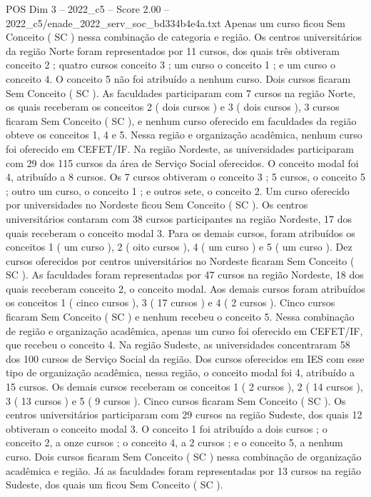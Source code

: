 \begin{textsample}{POS Dim 3 – 2022\_c5 – Score 2.00 – 2022\_c5/enade\_2022\_serv\_soc\_bd334b4e4a.txt}
Apenas um curso ficou Sem Conceito ( SC ) nessa combinação de categoria e região.
Os centros universitários da região Norte foram representados por 11 cursos, dos quais três obtiveram conceito 2 ; quatro cursos conceito 3 ; um curso o conceito 1 ; e um curso o conceito 4.
O conceito 5 não foi atribuído a nenhum curso.
Dois cursos ficaram Sem Conceito ( SC ).
As faculdades participaram com 7 cursos na região Norte, os quais receberam os conceitos 2 ( dois cursos ) e 3 ( dois cursos ), 3 cursos ficaram Sem Conceito ( SC ), e nenhum curso oferecido em faculdades da região obteve os conceitos 1, 4 e 5.
Nessa região e organização acadêmica, nenhum curso foi oferecido em CEFET/IF.
Na região Nordeste, as universidades participaram com 29 dos 115 cursos da área de Serviço Social oferecidos.
O conceito modal foi 4, atribuído a 8 cursos.
Os 7 cursos obtiveram o conceito 3 ; 5 cursos, o conceito 5 ; outro um curso, o conceito 1 ; e outros sete, o conceito 2.
Um curso oferecido por universidades no Nordeste ficou Sem Conceito ( SC ).
Os centros universitários contaram com 38 cursos participantes na região Nordeste, 17 dos quais receberam o conceito modal 3.
Para os demais cursos, foram atribuídos os conceitos 1 ( um curso ), 2 ( oito cursos ), 4 ( um curso ) e 5 ( um curso ).
Dez cursos oferecidos por centros universitários no Nordeste ficaram Sem Conceito ( SC ).
As faculdades foram representadas por 47 cursos na região Nordeste, 18 dos quais receberam conceito 2, o conceito modal.
Aos demais cursos foram atribuídos os conceitos 1 ( cinco cursos ), 3 ( 17 cursos ) e 4 ( 2 cursos ).
Cinco cursos ficaram Sem Conceito ( SC ) e nenhum recebeu o conceito 5.
Nessa combinação de região e organização acadêmica, apenas um curso foi oferecido em CEFET/IF, que recebeu o conceito 4.
Na região Sudeste, as universidades concentraram 58 dos 100 cursos de Serviço Social da região.
Dos cursos oferecidos em IES com esse tipo de organização acadêmica, nessa região, o conceito modal foi 4, atribuído a 15 cursos.
Os demais cursos receberam os conceitos 1 ( 2 cursos ), 2 ( 14 cursos ), 3 ( 13 cursos ) e 5 ( 9 cursos ).
Cinco cursos ficaram Sem Conceito ( SC ).
Os centros universitários participaram com 29 cursos na região Sudeste, dos quais 12 obtiveram o conceito modal 3.
O conceito 1 foi atribuído a dois cursos ; o conceito 2, a onze cursos ; o conceito 4, a 2 cursos ; e o conceito 5, a nenhum curso.
Dois cursos ficaram Sem Conceito ( SC ) nessa combinação de organização acadêmica e região.
Já as faculdades foram representadas por 13 cursos na região Sudeste, dos quais um ficou Sem Conceito ( SC ).

\end{textsample}
